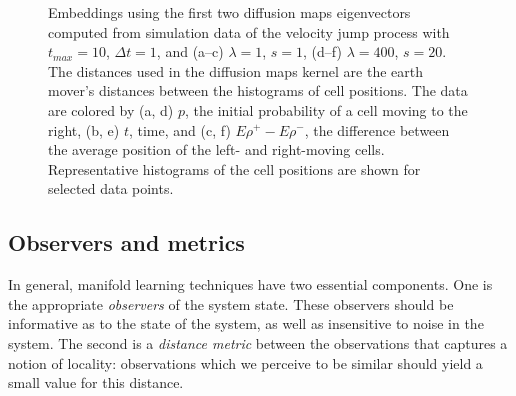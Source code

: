 \documentclass[3p]{elsarticle}
\begin{document}
\begin{figure}[t!]
\begin{subfigure}{\figwidth}
\caption{}
\label{subfig:large_lambda_rho}
\end{subfigure}
\caption{Embeddings using the first two diffusion maps eigenvectors computed from simulation data of the velocity jump process with $t_{max} = 10$, $\Delta t=1$, and (a--c) $\lambda=1$, $s=1$, (d--f) $\lambda=400$, $s=20$.  The distances used in the diffusion maps kernel are the earth mover's distances between the histograms of cell positions. The data are colored by (a, d) $p$, the initial probability of a cell moving to the right, (b, e) $t$, time, and (c, f) $E \rho^+ - E \rho^-$, the difference between the average position of the left- and right-moving cells. Representative histograms of the cell positions are shown for selected data points. }
\label{fig:dmaps_embed_emd}
\end{figure}

\subsection{Observers and metrics}

In general, manifold learning techniques have two essential components.
%
One is the appropriate {\em observers} of the system state.
%
These observers should be informative as to the state of the system, as well as insensitive to noise in the system.
%
The second is a {\em distance metric} between the observations that captures a notion of locality: 
observations which we perceive to be similar should yield a small value for this distance.
\end{document}
